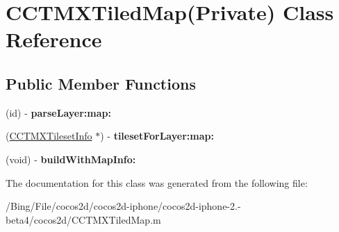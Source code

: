 \hypertarget{interface_c_c_t_m_x_tiled_map_07_private_08}{\section{C\-C\-T\-M\-X\-Tiled\-Map(Private) Class Reference}
\label{interface_c_c_t_m_x_tiled_map_07_private_08}
}
\subsection*{Public Member Functions}
\begin{DoxyCompactItemize}
\item 
\hypertarget{interface_c_c_t_m_x_tiled_map_07_private_08_af2fc73d70a67195de6b27043868aaa0f}{(id) -\/ {\bfseries parse\-Layer\-:map\-:}}\label{interface_c_c_t_m_x_tiled_map_07_private_08_af2fc73d70a67195de6b27043868aaa0f}

\item 
\hypertarget{interface_c_c_t_m_x_tiled_map_07_private_08_a093de1f74a5e785b13aa62c359d06d01}{(\hyperlink{interface_c_c_t_m_x_tileset_info}{C\-C\-T\-M\-X\-Tileset\-Info} $\ast$) -\/ {\bfseries tileset\-For\-Layer\-:map\-:}}\label{interface_c_c_t_m_x_tiled_map_07_private_08_a093de1f74a5e785b13aa62c359d06d01}

\item 
\hypertarget{interface_c_c_t_m_x_tiled_map_07_private_08_ac090aabfe94f3d73a6803f1587f7dd5b}{(void) -\/ {\bfseries build\-With\-Map\-Info\-:}}\label{interface_c_c_t_m_x_tiled_map_07_private_08_ac090aabfe94f3d73a6803f1587f7dd5b}

\end{DoxyCompactItemize}


The documentation for this class was generated from the following file\-:\begin{DoxyCompactItemize}
\item 
/\-Bing/\-File/cocos2d/cocos2d-\/iphone/cocos2d-\/iphone-\/2.-\/beta4/cocos2d/C\-C\-T\-M\-X\-Tiled\-Map.\-m\end{DoxyCompactItemize}
